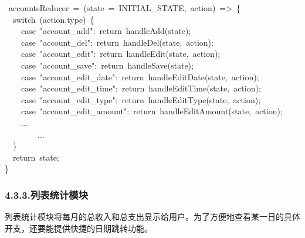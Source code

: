 \documentclass{article}
\begin{document}
\begin{mdpre}%
~accountsReducer~=~(state~=~INITIAL\_STATE,~action)~=\textgreater{}~\{\\
~~{switch}~(action.type)~\{\\
~~~~{case}~{"}{account\_add}{"}:~{return}~handleAdd(state);\\
~~~~{case}~{"}{account\_del}{"}:~{return}~handleDel(state,~action);\\
~~~~{case}~{"}{account\_edit}{"}:~{return}~handleEdit(state,~action);\\
~~~~{case}~{"}{account\_save}{"}:~{return}~handleSave(state);\\
~~~~{case}~{"}{account\_edit\_date}{"}:~{return}~handleEditDate(state,~action);\\
~~~~{case}~{"}{account\_edit\_time}{"}:~{return}~handleEditTime(state,~action);\\
~~~~{case}~{"}{account\_edit\_type}{"}:~{return}~handleEditType(state,~action);\\
~~~~{case}~{"}{account\_edit\_amount}{"}:~{return}~handleEditAmount(state,~action);\\
~~~~...\\
~~~~~~~~...\\
~~\}\\
~~{return}~state;\\
\}%
\end{mdpre}
\subsubsection{4.3.3.\hspace*{0.5em}列表统计模块}\label{section}%

\noindent{}列表统计模块将每月的总收入和总支出显示给用户。为了方便地查看某一日的具体开支，还要能提供快捷的日期跳转功能。%
\end{document}
